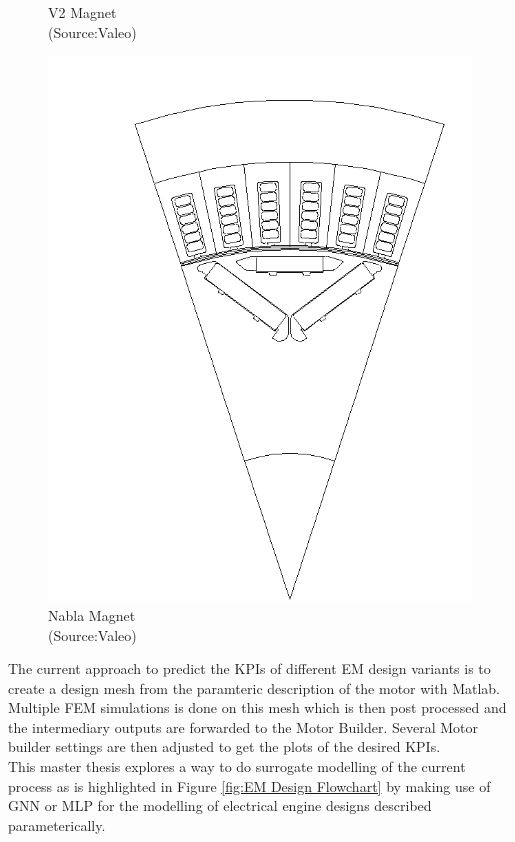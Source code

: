 \documentclass{report} %
\begin{document}
\begin{figure}[H]
\begin{minipage}[b]{0.325\textwidth}
        \caption{V2 Magnet\\ (Source:Valeo)}
        \label{fig:V2 Magnet}
    \end{minipage}
    \hfill
    \begin{minipage}[b]{0.325\textwidth}
        \includegraphics[width=\textwidth]{./ReportImages/Nabla_Magnet.png}
        \caption{Nabla Magnet\\ (Source:Valeo)}
        \label{fig:Nabla Magnet}
    \end{minipage}
\end{figure}
The current approach to predict the \ac{KPI}s of different \ac{EM} design variants is to create a design mesh from the paramteric description of the motor with Matlab.
Multiple FEM simulations is done on this mesh which is then post processed and the intermediary outputs are forwarded to the Motor Builder.
Several Motor builder settings are then adjusted to get the plots of the desired \ac{KPI}s.\\
This master thesis explores a way to do surrogate modelling of the current process as is highlighted in Figure \ref{fig:EM Design Flowchart} by making use of \ac{GNN} or \ac{MLP} for the modelling of electrical engine designs described parameterically. \\
\end{document}
